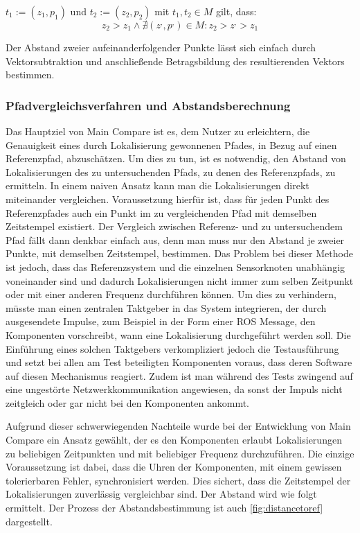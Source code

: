$t_1 := (z_1, p_1)$ und $t_2 := (z_2, p_2)$
mit
$t_1,t_2 \in M$
gilt, dass:
\[
z_2 > z_1 \wedge \nexists (z^{,}, p^{,}) \in M : z_2 > z^{,} > z_1
\]

Der Abstand zweier aufeinanderfolgender Punkte lässt sich einfach durch
Vektorsubtraktion und anschließende Betragsbildung des resultierenden Vektors
bestimmen.

\subsubsection{Pfadvergleichsverfahren und Abstandsberechnung}

Das Hauptziel von Main Compare ist es, dem Nutzer zu erleichtern, die
Genauigkeit eines durch Lokalisierung gewonnenen Pfades, in Bezug auf einen
Referenzpfad, abzuschätzen. Um dies zu tun, ist es notwendig, den Abstand von
Lokalisierungen des zu untersuchenden Pfads, zu denen des Referenzpfads, zu
ermitteln. In einem naiven Ansatz kann man die Lokalisierungen direkt
miteinander vergleichen. Voraussetzung hierfür ist, dass für jeden Punkt des Referenzpfades auch
ein Punkt im zu vergleichenden Pfad mit demselben Zeitstempel existiert. Der
Vergleich zwischen Referenz- und zu untersuchendem Pfad fällt dann denkbar
einfach aus, denn man muss nur den Abstand je
zweier Punkte, mit demselben Zeitstempel, bestimmen.
Das Problem bei dieser Methode ist jedoch, dass das Referenzsystem und die
einzelnen Sensorknoten unabhängig voneinander sind und dadurch Lokalisierungen
nicht immer zum selben Zeitpunkt oder mit einer anderen Frequenz durchführen 
können. Um dies zu verhindern, müsste man einen zentralen
Taktgeber in das System integrieren, der durch ausgesendete Impulse, zum
Beispiel in der Form einer ROS Message, den Komponenten vorschreibt,
wann eine Lokalisierung durchgeführt werden soll.
Die Einführung eines solchen Taktgebers verkompliziert jedoch die
Testausführung und setzt bei allen am Test beteiligten Komponenten voraus, dass
deren Software auf diesen Mechanismus reagiert. Zudem ist man während des Tests
zwingend auf eine ungestörte Netzwerkkommunikation angewiesen, da sonst der
Impuls nicht zeitgleich oder gar nicht bei den Komponenten ankommt.

Aufgrund dieser schwerwiegenden Nachteile wurde bei der Entwicklung von Main
Compare ein Ansatz gewählt, der es den Komponenten erlaubt Lokalisierungen zu
beliebigen Zeitpunkten und mit beliebiger Frequenz durchzuführen. Die einzige
Voraussetzung ist dabei, dass die Uhren der Komponenten, mit einem gewissen
tolerierbaren Fehler, synchronisiert werden. Dies sichert, dass die Zeitstempel der
Lokalisierungen zuverlässig vergleichbar sind. Der Abstand wird wie folgt
ermittelt. Der Prozess der Abstandsbestimmung ist auch
\autoref{fig:distancetoref} dargestellt.


